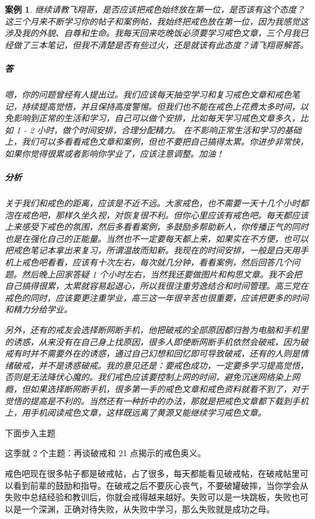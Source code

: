 \documentclass{ctexart}
\newtheorem{case}{案例}
\begin{document}
\begin{case}
    继续请教飞翔哥，是否应该把戒色始终放在第一位，是否该有这个态度？这三个月来不断学习你的帖子和案例帖，我始终把戒色放在第一位，因为我感觉这涉及我的外貌、自尊和生命。我每天回来吃晚饭必须要学习戒色文章，三个月我已经做了三本笔记，但我不清楚是否有些过火，还是就该有此态度？请飞翔哥解答。

    \subparagraph{答} 嗯，你的问题曾经有人提出过。我们应该每天抽空学习和复习戒色文章和戒色笔记，持续提高觉悟，并且保持高度警惕。但我们也不能在戒色上花费太多时间，以免影响到正常的生活和学习，自己可以做个安排，比如每天学习戒色文章多久，比如 1 - 2 小时，做个时间安排，合理分配精力。 在不影响正常生活和学习的基础上，我们可以多看看戒色文章和案例，但也不要把自己搞得太累。你进步非常快，如果你觉得很累或者影响你学业了，应该注意调整。加油！

    \subparagraph{分析} 关于我们和戒色的距离，应该是不近不远。大家戒色，也不需要一天十几个小时都泡在戒色吧，那样久坐久视，对恢复很不利。但你心里应该有戒色吧。每天都应该上来感受下戒色的氛围，然后多看看案例，多鼓励多帮助新人，你传播正气的同时也是在强化自己的正能量。当然也不一定要每天都上来，如果实在不方便，也可以把戒色笔记本拿出来复习，所谓温故而知新。我现在的时间安排，一般是白天用手机上戒色吧看看，应该有十次左右，每次就几分钟，看看案例，然后回答几个问题。然后晚上回家答疑 1 个小时左右，当然我还要做图片和构思文章。我不会把自己搞得很累，太累就容易起退心，所以我很注重劳逸结合和时间管理。高三党在戒色的同时，应该要更注重学业，高三这一年很辛苦也很重要，应该把更多的时间和精力分给学业。

    另外，还有的戒友会选择断网断手机，他把破戒的全部原因都归咎为电脑和手机里的诱惑，从来没有在自己身上找原因，很多人即使断网断手机依然会破戒，因为破戒有时并不需要外在的诱惑，通过自己幻想和回忆即可导致破戒，还有的人则是情绪破戒，并不是诱惑破戒。我的意见还是：要戒色成功，一定要多学习提高觉悟，否则是无法降伏心魔的。我们戒色应该要控制上网的时间，避免沉迷网络染上网瘾，但如果选择断网断手机，很多第一手的戒色文章和戒色资料就看不到了，对于觉悟的提高是不利的。当然还有一种折中的办法，那就是把戒色文章都下载到手机上，用手机阅读戒色文章，这样既远离了黄源又能继续学习戒色文章。
\end{case}

下面步入主题

这季就 2 个主题：再谈破戒和 21 点揭示的戒色奥义。

戒色吧现在很多帖子都是破戒帖，占了很多，每天都能看见破戒帖，在破戒帖里可以看到前辈的鼓励和指导。在破戒之后不要灰心丧气，不要破罐破摔，当你学会从失败中总结经验和教训后，你就会戒得越来越好。失败可以是一块跳板，失败也可以是一个深渊，正确对待失败，从失败中学习，那么失败就是成功之母。
\end{document}
